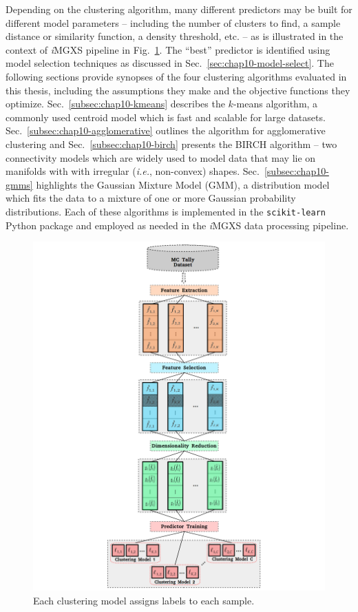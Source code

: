 Depending on the clustering algorithm, many different predictors may be built for different model parameters -- including the number of clusters to find, a sample distance or similarity function, a density threshold, etc. -- as is illustrated in the context of \textit{i}\ac{MGXS} pipeline in Fig.~\ref{fig:chap10-cluster}. The ``best'' predictor is identified using model selection techniques as discussed in Sec.~\ref{sec:chap10-model-select}. The following sections provide synopses of the four clustering algorithms evaluated in this thesis, including the assumptions they make and the objective functions they optimize. Sec.~\ref{subsec:chap10-kmeans} describes the $k$-means algorithm, a commonly used centroid model which is fast and scalable for large datasets. Sec.~\ref{subsec:chap10-agglomerative} outlines the algorithm for agglomerative clustering and Sec.~\ref{subsec:chap10-birch} presents the BIRCH algorithm -- two connectivity models which are widely used to model data that may lie on manifolds with with irregular (\textit{i.e.}, non-convex) shapes. Sec.~\ref{subsec:chap10-gmms} highlights the Gaussian Mixture Model (GMM), a distribution model which fits the data to a mixture of one or more Gaussian probability distributions. Each of these algorithms is implemented in the \texttt{scikit-learn} Python package and employed as needed in the \textit{i}\ac{MGXS} data processing pipeline.

\begin{figure}[h!]
\centering
\includegraphics[width=0.95\linewidth]{figures/unsupervised/features/engineering/cluster}
\vspace{2mm}
\caption[\textit{i}MGXS clustering]{Each clustering model assigns labels to each sample.}
\label{fig:chap10-cluster}
\end{figure}

